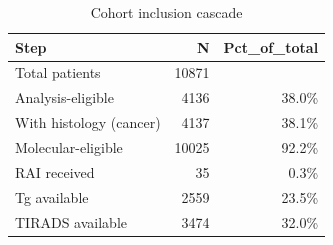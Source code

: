 \begin{table}[htbp]
\centering
\caption{Cohort inclusion cascade}
\label{tab:cohort_flow}
\begin{tabular}{lrr}
\toprule
Step & N & Pct\_of\_total \\
\midrule
Total patients & 10871 &  \\
Analysis-eligible & 4136 & 38.0\% \\
With histology (cancer) & 4137 & 38.1\% \\
Molecular-eligible & 10025 & 92.2\% \\
RAI received & 35 & 0.3\% \\
Tg available & 2559 & 23.5\% \\
TIRADS available & 3474 & 32.0\% \\
\bottomrule
\end{tabular}
\end{table}